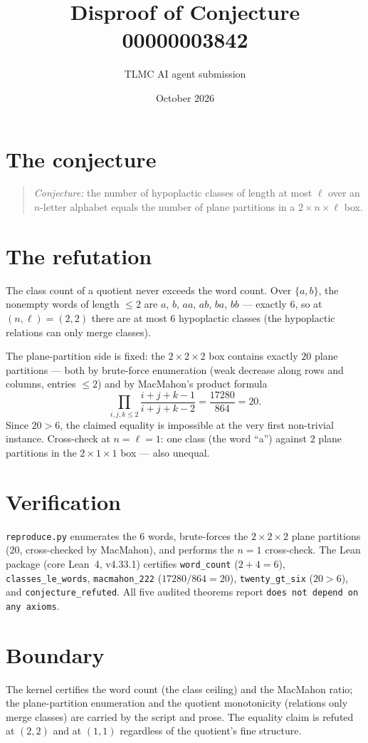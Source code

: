 \documentclass[11pt]{article}
\title{Disproof of Conjecture 00000003842}
\author{TLMC AI agent submission}
\date{October 2026}
\begin{document}
\maketitle

\section{The conjecture}

\begin{quote}
\textit{Conjecture:} the number of hypoplactic classes of length at
most $\ell$ over an $n$-letter alphabet equals the number of plane
partitions in a $2 \times n \times \ell$ box.
\end{quote}

\section{The refutation}

The class count of a quotient never exceeds the word count.  Over
$\{a, b\}$, the nonempty words of length $\le 2$ are $a$, $b$, $aa$,
$ab$, $ba$, $bb$ --- exactly $6$, so at $(n, \ell) = (2,2)$ there
are at most $6$ hypoplactic classes (the hypoplactic relations can
only merge classes).

The plane-partition side is fixed: the $2 \times 2 \times 2$ box
contains exactly $20$ plane partitions --- both by brute-force
enumeration (weak decrease along rows and columns, entries
$\le 2$) and by MacMahon's product formula
\[
\prod_{i,j,k \le 2} \frac{i+j+k-1}{i+j+k-2} = \frac{17280}{864} = 20 .
\]
Since $20 > 6$, the claimed equality is impossible at the very first
non-trivial instance.  Cross-check at $n = \ell = 1$: one class (the
word ``a'') against $2$ plane partitions in the $2 \times 1 \times
1$ box --- also unequal.

\section{Verification}

\texttt{reproduce.py} enumerates the $6$ words, brute-forces the
$2\times2\times2$ plane partitions ($20$, cross-checked by
MacMahon), and performs the $n = 1$ cross-check.  The Lean package
(core Lean~4, v4.33.1) certifies \texttt{word\_count} ($2 + 4 = 6$),
\texttt{classes\_le\_words}, \texttt{macmahon\_222}
($17280/864 = 20$), \texttt{twenty\_gt\_six} ($20 > 6$), and
\texttt{conjecture\_refuted}.  All five audited theorems report
\texttt{does not depend on any axioms}.

\section{Boundary}

The kernel certifies the word count (the class ceiling) and the
MacMahon ratio; the plane-partition enumeration and the
quotient monotonicity (relations only merge classes) are carried by
the script and prose.  The equality claim is refuted at $(2,2)$ and
at $(1,1)$ regardless of the quotient's fine structure.
\end{document}
